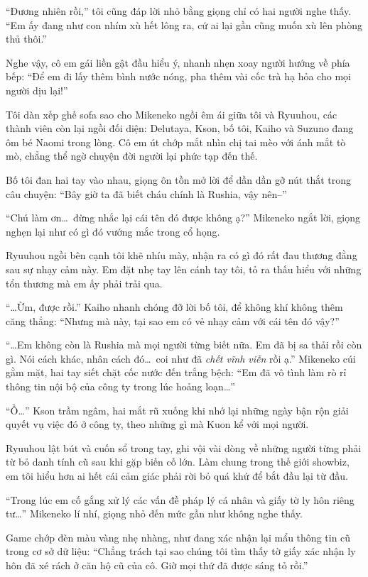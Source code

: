 ﻿\documentclass[../main.tex]{subfiles}
\begin{document}
``Đương nhiên rồi,'' tôi cũng đáp lời nhỏ bằng giọng chỉ có hai người nghe thấy. ``Em ấy đang như con nhím xù hết lông ra, cứ ai lại gần cũng muốn xù lên phòng thủ thôi.''

Nghe vậy, cô em gái liền gật đầu hiểu ý, nhanh nhẹn xoay người hướng về phía bếp: ``Để em đi lấy thêm bình nước nóng, pha thêm vài cốc trà hạ hỏa cho mọi người dịu lại!''

\ct

Tôi dàn xếp ghế sofa sao cho Mikeneko ngồi êm ái giữa tôi và Ryuuhou, các thành viên còn lại ngồi đối diện: Delutaya, Kson, bố tôi, Kaiho và Suzuno đang ôm bé Naomi trong lòng. Cô em út chớp mắt nhìn chị tai mèo với ánh mắt tò mò, chẳng thể ngờ chuyện đời người lại phức tạp đến thế.

Bố tôi đan hai tay vào nhau, giọng ôn tồn mở lời để dần dần gỡ nút thắt trong câu chuyện: ``Bây giờ ta đã biết cháu chính là Rushia, vậy nên--''

``Chú làm ơn\dots\ đừng nhắc lại cái tên đó được không ạ?'' Mikeneko ngắt lời, giọng nghẹn lại như có gì đó vướng mắc trong cổ họng.

Ryuuhou ngồi bên cạnh tôi khẽ nhíu mày, nhận ra có gì đó rất đau thương đằng sau sự nhạy cảm này. Em đặt nhẹ tay lên cánh tay tôi, tỏ ra thấu hiểu với những tổn thương mà em ấy phải trải qua.

``\dots Ừm, được rồi.'' Kaiho nhanh chóng đỡ lời bố tôi, để không khí không thêm căng thẳng: ``Nhưng mà này, tại sao em có vẻ nhạy cảm với cái tên đó vậy?''

``\dots Em không còn là Rushia mà mọi người từng biết nữa. Em đã bị sa thải rồi còn gì. Nói cách khác, nhân cách đó\dots\ coi như đã \emph{chết vĩnh viễn} rồi ạ.'' Mikeneko cúi gằm mặt, hai tay siết chặt cốc nước đến trắng bệch: ``Em đã vô tình làm rò rỉ thông tin nội bộ của công ty trong lúc hoảng loạn\dots''

``Ồ\dots'' Kson trầm ngâm, hai mắt rũ xuống khi nhớ lại những ngày bận rộn giải quyết vụ việc đó ở công ty, theo những gì mà Kuon kể với mọi người.

Ryuuhou lật bút và cuốn sổ trong tay, ghi vội vài dòng về những người từng phải từ bỏ danh tính cũ sau khi gặp biến cố lớn. Làm chung trong thế giới showbiz, em tôi hiểu hơn ai hết cái cảm giác phải rời bỏ quá khứ để bắt đầu lại từ đầu.

``Trong lúc em cố gắng xử lý các vấn đề pháp lý cá nhân và giấy tờ ly hôn riêng tư\dots'' Mikeneko lí nhí, giọng nhỏ đến mức gần như không nghe thấy.

Game chớp đèn màu vàng nhẹ nhàng, như đang xác nhận lại mẩu thông tin cũ trong cơ sở dữ liệu: ``Chẳng trách tại sao chúng tôi tìm thấy tờ giấy xác nhận ly hôn đã xé rách ở căn hộ cũ của cô. Giờ mọi thứ đã được sáng tỏ rồi.''
\end{document}
